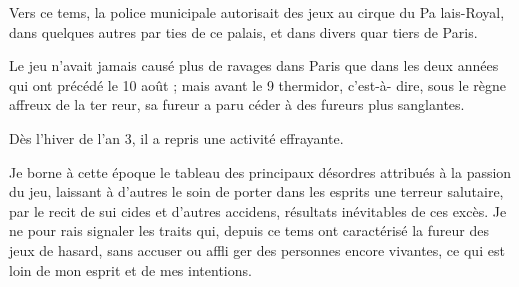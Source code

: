 Vers ce tems, la police municipale
autorisait des jeux au cirque du Pa%
lais-Royal, dans quelques autres par%
ties de ce palais, et dans divers quar%
tiers de Paris.

Le jeu n'avait jamais causé plus de
ravages dans Paris que dans les deux
années qui ont précédé le 10 août ;
mais avant le 9 thermidor, c'est-à-%
dire, sous le règne affreux de la ter%
reur, sa fureur a paru céder à des
fureurs plus sanglantes.

Dès l'hiver de l'an 3, il a repris une
activité effrayante.

Je borne à cette époque le tableau
des principaux désordres attribués à
la passion du jeu, laissant à d'autres
le soin de porter dans les esprits une
terreur salutaire, par le recit de sui%
cides et d'autres accidens, résultats
inévitables de ces excès. Je ne pour%
rais signaler les traits qui, depuis ce
tems ont caractérisé la fureur des
jeux de hasard, sans accuser ou affli%
ger des personnes encore vivantes,
ce qui est loin de mon esprit et de
mes intentions.
